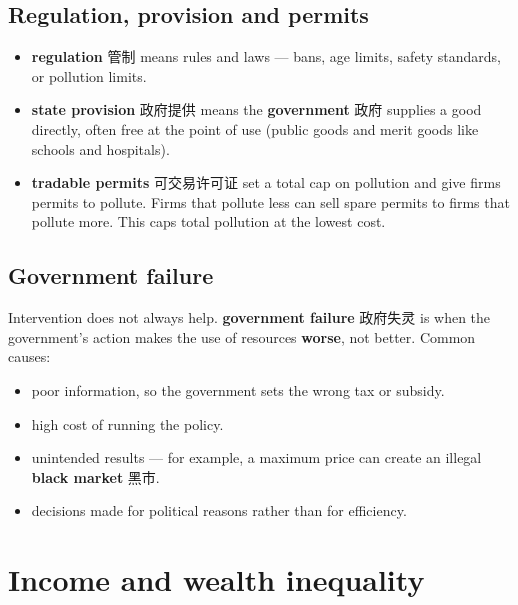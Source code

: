 \documentclass[11pt]{article}
\begin{document}
\subsection*{Regulation, provision and permits}

\begin{itemize}
\item \textbf{regulation} 管制 means rules and laws — bans, age limits, safety standards, or pollution limits.

\item \textbf{state provision} 政府提供 means the \textbf{government} 政府 supplies a good directly, often free at the point of use (public goods and merit goods like schools and hospitals).

\item \textbf{tradable permits} 可交易许可证 set a total cap on pollution and give firms permits to pollute. Firms that pollute less can sell spare permits to firms that pollute more. This caps total pollution at the lowest cost.

\end{itemize}

\subsection*{Government failure}

Intervention does not always help. \textbf{government failure} 政府失灵 is when the government's action makes the use of resources \textbf{worse}, not better. Common causes:

\begin{itemize}
\item poor information, so the government sets the wrong tax or subsidy.

\item high cost of running the policy.

\item unintended results — for example, a maximum price can create an illegal \textbf{black market} 黑市.

\item decisions made for political reasons rather than for efficiency.

\end{itemize}

\section*{Income and wealth inequality}
\end{document}

